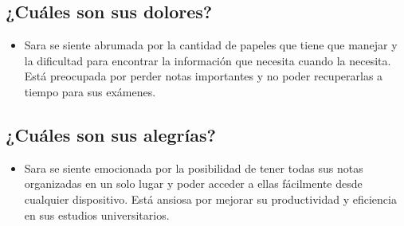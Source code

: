 \subsection*{¿Cuáles son sus dolores?}
\begin{itemize}
    \item Sara se siente abrumada por la cantidad de papeles que tiene que manejar y la dificultad para encontrar la información que necesita cuando la necesita. Está preocupada por perder notas importantes y no poder recuperarlas a tiempo para sus exámenes.
\end{itemize}

\subsection*{¿Cuáles son sus alegrías?}
\begin{itemize}
    \item Sara se siente emocionada por la posibilidad de tener todas sus notas organizadas en un solo lugar y poder acceder a ellas fácilmente desde cualquier dispositivo. Está ansiosa por mejorar su productividad y eficiencia en sus estudios universitarios.
\end{itemize}
